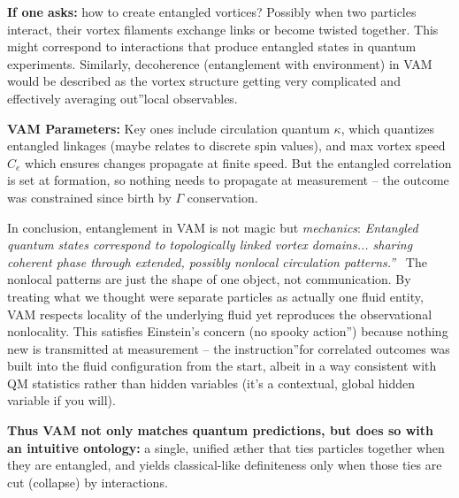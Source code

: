\documentclass[a4paper, aps,preprint,superscriptaddress, 12pt]{revtex4}
\begin{document}
\textbf{If one asks:} how to create entangled vortices? Possibly when two particles interact, their vortex filaments exchange links or become twisted together. This might correspond to interactions that produce entangled states in quantum experiments. Similarly, decoherence (entanglement with environment) in VAM would be described as the vortex structure getting very complicated and effectively \grqq averaging out\textquotedblright local observables.


\textbf{VAM Parameters:} Key ones include circulation quantum $\kappa$, which quantizes entangled linkages (maybe relates to discrete spin values), and max vortex speed $C_e$ which ensures changes propagate at finite speed. But the entangled correlation is set at formation, so nothing needs to propagate at measurement – the outcome was constrained since birth by $\Gamma$ conservation.


In conclusion, entanglement in VAM is not magic but \textit{mechanics}: \textit{\grqq Entangled quantum states correspond to topologically linked vortex domains... sharing coherent phase through extended, possibly nonlocal circulation patterns.\textquotedblright}~\cite{Iskandarani2025c}  The nonlocal patterns are just the shape of one object, not communication. By treating what we thought were separate particles as actually one fluid entity, VAM respects locality of the underlying fluid yet reproduces the observational nonlocality. This satisfies Einstein's concern (\grqq no spooky action\textquotedblright) because nothing new is transmitted at measurement – the \grqq instruction\textquotedblright for correlated outcomes was built into the fluid configuration from the start, albeit in a way consistent with QM statistics rather than hidden variables (it's a contextual, global hidden variable if you will).


\textbf{Thus VAM not only matches quantum predictions, but does so with an intuitive ontology:} a single, unified æther that ties particles together when they are entangled, and yields classical-like definiteness only when those ties are cut (collapse) by interactions.
\end{document}
